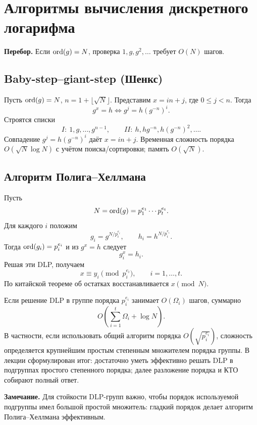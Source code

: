 \documentclass[12pt,a4paper]{article}
\begin{document}
\section{Алгоритмы вычисления дискретного логарифма}
\textbf{Перебор.} Если $\operatorname{ord}(g)=N$, проверка $1,g,g^2,\ldots$ требует $O(N)$ шагов.

\subsection*{Baby-step--giant-step (Шенкс)}
Пусть $\operatorname{ord}(g)=N$, $n=1+\lfloor\sqrt N\rfloor$. Представим $x=in+j$, где $0\le j<n$. Тогда
\[g^x=h\iff g^j=h(g^{-n})^i.\]
Строятся списки
\[I:\ 1,g,\ldots,g^{n-1},\qquad II:\ h,hg^{-n},h(g^{-n})^2,\ldots.\]
Совпадение $g^j=h(g^{-n})^i$ даёт $x=in+j$. Временная сложность порядка $O(\sqrt N\log N)$ с учётом поиска/сортировки; память $O(\sqrt N)$.

\subsection*{Алгоритм Полига--Хеллмана}
Пусть
\[N=\operatorname{ord}(g)=p_1^{e_1}\cdots p_t^{e_t}.\]
Для каждого $i$ положим
\[g_i=g^{N/p_i^{e_i}},\qquad h_i=h^{N/p_i^{e_i}}.\]
Тогда $\operatorname{ord}(g_i)=p_i^{e_i}$ и из $g^x=h$ следует
\[g_i^x=h_i.\]
Решая эти DLP, получаем
\[x\equiv y_i\pmod{p_i^{e_i}},\qquad i=1,\ldots,t.\]
По китайской теореме об остатках восстанавливается $x\pmod N$.

Если решение DLP в группе порядка $p_i^{e_i}$ занимает $O(\Omega_i)$ шагов, суммарно
\[O\!\left(\sum_{i=1}^t\Omega_i+\log N\right).\]
В частности, если использовать общий алгоритм порядка $O(\sqrt{p_i^{e_i}})$, сложность определяется крупнейшим простым степенным множителем порядка группы. В лекции сформулирован итог: достаточно уметь эффективно решать DLP в подгруппах простого степенного порядка; далее разложение порядка и КТО собирают полный ответ.

\textbf{Замечание.} Для стойкости DLP-групп важно, чтобы порядок используемой подгруппы имел большой простой множитель: гладкий порядок делает алгоритм Полига--Хеллмана эффективным.
\end{document}
